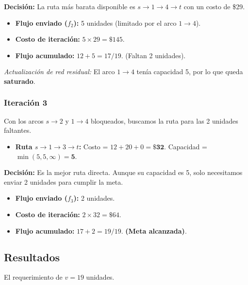\documentclass[10pt,a4paper]{article}
\begin{document}
\textbf{Decisión:} La ruta más barata disponible es $s \to 1 \to 4 \to t$ con un costo de \$29. 
\begin{itemize}
    \item \textbf{Flujo enviado ($f_2$):} 5 unidades (limitado por el arco $1 \to 4$).
    \item \textbf{Costo de iteración:} $5 \times 29 = \$145$.
    \item \textbf{Flujo acumulado:} $12 + 5 = 17 / 19$. (Faltan 2 unidades).
\end{itemize}
\textit{Actualización de red residual:} El arco $1 \to 4$ tenía capacidad 5, por lo que queda \textbf{saturado}.

\subsubsection*{Iteración 3}
Con los arcos $s \to 2$ y $1 \to 4$ bloqueados, buscamos la ruta para las 2 unidades faltantes.
\begin{itemize}
    \item \textbf{Ruta $s \to 1 \to 3 \to t$:} Costo = $12 + 20 + 0 = \mathbf{\$32}$. Capacidad = $\min(5, 5, \infty) = \mathbf{5}$.
\end{itemize}

\textbf{Decisión:} Es la mejor ruta directa. Aunque su capacidad es 5, solo necesitamos enviar 2 unidades para cumplir la meta.
\begin{itemize}
    \item \textbf{Flujo enviado ($f_3$):} 2 unidades.
    \item \textbf{Costo de iteración:} $2 \times 32 = \$64$.
    \item \textbf{Flujo acumulado:} $17 + 2 = 19 / 19$. \textbf{(Meta alcanzada)}.
\end{itemize}

\subsection{Resultados}

El requerimiento de $v=19$ unidades.
\end{document}
